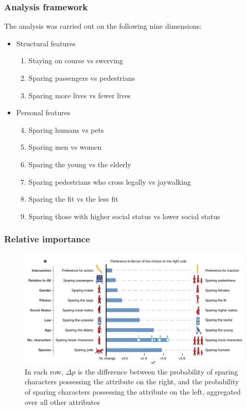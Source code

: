 \documentclass[aspectratio=169]{beamer}
\begin{document}
\begin{frame}
    \frametitle{Analysis framework}
    The analysis was carried out on the following nine dimensions:
    \begin{itemize}
        \item Structural features
              \begin{enumerate}
                  \item Staying on course vs swerving
                  \item Sparing passengers vs pedestrians
                  \item Sparing more lives vs fewer lives
              \end{enumerate}
        \item Personal features
              \begin{enumerate}
                  \setcounter{enumi}{3}
                  \item Sparing humans vs pets
                  \item Sparing men vs women
                  \item Sparing the young vs the elderly
                  \item Sparing pedestrians who cross legally vs jaywalking
                  \item Sparing the fit vs the less fit
                  \item Sparing those with higher social status vs lower social status
              \end{enumerate}
    \end{itemize}
\end{frame}

\begin{frame}
    \frametitle{Relative importance}
    \begin{figure}
        \center
        \includegraphics[width=0.8\linewidth]{assets/relative-importance-mme.jpg}
        \caption{In each row, $\Delta p$ is the difference between the probability of sparing characters possessing the attribute on the right, and the probability of sparing characters possessing the attribute on the left, aggregated over all other attributes}
    \end{figure}
\end{frame}
\end{document}
